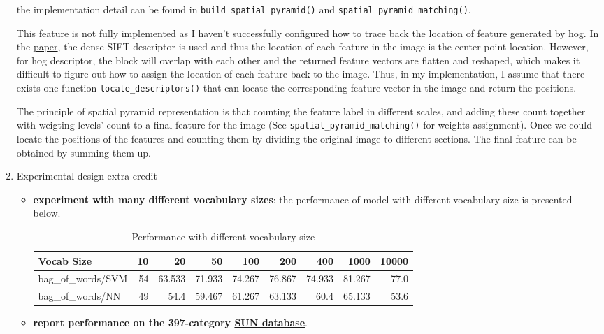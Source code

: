 \begin{enumerate}
    the implementation detail can be found in \verb|build_spatial_pyramid()| and \verb|spatial_pyramid_matching()|.

    This feature is not fully implemented as I haven't successfully configured how to trace back the location of feature generated by hog. In the \hyperlink{https://inc.ucsd.edu/~marni/Igert/Lazebnik_06.pdf}{paper}, the dense SIFT descriptor is used and thus the location of each feature in the image is the center point location. However, for hog descriptor, the block will overlap with each other and the returned feature vectors are flatten and reshaped, which makes it difficult to figure out how to assign the location of each feature back to the image. Thus, in my implementation, I assume that there exists one function \verb|locate_descriptors()| that can locate the corresponding feature vector in the image and return the positions.
    
    The principle of spatial pyramid representation is that counting the feature label in different scales, and adding these count together with weigting levels' count to a final feature for the image (See \verb|spatial_pyramid_matching()| for weights assignment). Once we could locate the positions of the features and counting them by dividing the original image to different sections. The final feature can be obtained by summing them up.

    \item Experimental design extra credit
          \begin{itemize}
              \item \textbf{experiment with many different vocabulary sizes}: the performance of model with different vocabulary size is presented below.
                    \begin{table}[h]
                        \centering
                        \begin{tabular}{lrrrrrrrr}
                            \toprule
                            Vocab Size         & 10 & 20     & 50     & 100    & 200    & 400    & 1000   & 10000 \\
                            \midrule
                            bag\_of\_words/SVM & 54 & 63.533 & 71.933 & 74.267 & 76.867 & 74.933 & 81.267 & 77.0  \\
                            bag\_of\_words/NN  & 49 & 54.4   & 59.467 & 61.267 & 63.133 & 60.4   & 65.133 & 53.6  \\
                            \bottomrule
                        \end{tabular}
                        \caption{Performance with different vocabulary size}
                        \label{svm}
                    \end{table}

              \item \textbf{report performance on the 397-category \hyperlink{https://vision.princeton.edu/projects/2010/SUN/}{SUN database}}.

          \end{itemize}
\end{enumerate}


